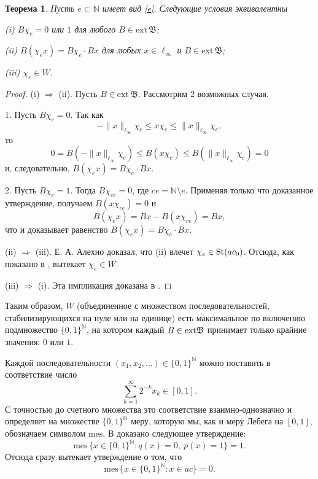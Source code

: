\documentclass[12pt]{article}
\newtheorem{thm}{Теорема}
\def\N{{\mathbb{N}}}
\def\B{{\mathfrak{B}}}
\def\ext{{\mathrm{ext}\,}}
\def\mes{{\mathrm{mes}}}
\begin{document}
\begin{thm}\label{thm1}
Пусть $e\subset \N$ имеет вид \eqref{e}. Следующие условия эквивалентны

(i) $B\chi_e=0$ или $1$ для любого $B\in \ext\B$;

(ii) $B(\chi_e x)= B\chi_e \cdot Bx$ для любых $x\in \ell_\infty$ и $B\in \ext\B$;

(iii) $\chi_e\in W$.
\end{thm}

\begin{proof}
(i) $\Longrightarrow$ (ii). Пусть $B\in \ext\B$. Рассмотрим 2 возможных случая.

1. Пусть $B\chi_e=0$. Так как
$$-\|x\|_{\ell_\infty}\chi_e \le x \chi_e \le \|x\|_{\ell_\infty}\chi_e,$$
то
$$0=B(-\|x\|_{\ell_\infty}\chi_e) \le B(x \chi_e) \le B(\|x\|_{\ell_\infty}\chi_e)=0$$
и, следовательно, $B(\chi_e x)= B\chi_e \cdot Bx$.

2. Пусть $B\chi_e=1$. Тогда $B\chi_{ce}=0$, где $ce=\N\setminus e$. Применяя только что доказанное утверждение, получаем $B(x\chi_{ce})=0$ и
$$B(\chi_e x)= Bx - B(x\chi_{ce})= Bx,$$
что и доказывает равенство $B(\chi_e x)= B\chi_e \cdot Bx$.


(ii) $\Longrightarrow$ (iii). Е. А. Алехно \cite[Утверждение 2.3]{Alekhno} доказал, что (ii) влечет $\chi_e \in {\rm St}(ac_0)$. Отсюда, как показано в  \cite[Лемма 35]{SSU2}, вытекает $\chi_e\in W$.

(iii) $\Longrightarrow$ (i). Эта импликация доказана в \cite[Следствие 29]{SSU2}.
\end{proof}

Таким образом, $W$ (объединенное с множеством последовательностей, стабилизирующихся на нуле или на единице) есть максимальное по включению подмножество $\{0,1\}^\N$, на котором каждый $B\in {\rm ext}\mathfrak B$ принимает только крайние значения: $0$ или $1$.

Каждой последовательности $(x_1, x_2, \dots)\in \{0,1\}^\N$ можно поставить в соответствие число
\begin{equation}\label{eq:bijection_omega_0_1}
	\sum_{k=1}^\infty 2^{-k} x_k \in [0,1]
	.
\end{equation}
С точностью до счетного множества это соответствие взаимно-однозначно и определяет на множестве $\{0,1\}^\N$ меру, которую мы, как и меру Лебега на $[0,1]$, обозначаем символом $\mes$. В \cite{SS} доказано следующее утверждение:
$$ \mes \, \{x\in \{0,1\}^\N: q(x)=0, \ p(x)=1\}=1.$$ Отсюда сразу вытекает утверждение \cite{Connor} о том, что
\begin{equation}\label{ac_meas}
\mes \, \{x\in \{0,1\}^\N: x\in ac\}=0.
\end{equation}
\end{document}
